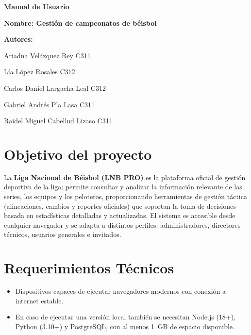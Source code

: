 \documentclass{report}
\begin{document}
    \begin{titlepage}
        \centering
        {\bfseries\Huge Manual de Usuario \par}
        \vspace*{1cm}
        \vspace*{3cm}
        \vspace*{1cm}
        {\LARGE \textbf{Nombre: Gestión de campeonatos de béisbol} }
        \vfill
        {\bfseries\LARGE Autores: \par}
        {\Large Ariadna Vel\'azquez Rey  C311 \par}
        {\Large L\'ia L\'opez Rosales  C312 \par}
        {\Large Carlos Daniel Largacha Leal  C312 \par}
        {\Large Gabriel Andr\'es Pla Lasa  C311 \par}
        {\Large Raidel Miguel Cabellud Lizaso C311 \par}
        \vfill
    \end{titlepage}

    \section*{Objetivo del proyecto}
    La \textbf{Liga Nacional de Béisbol (LNB PRO)} es la plataforma oficial de gestión deportiva de la
    liga: permite consultar y analizar la información relevante de las series, los equipos y los peloteros,
    proporcionando herramientas de gestión táctica (alineaciones, cambios y reportes oficiales) que soportan
    la toma de decisiones basada en estadísticas detalladas y actualizadas. El sistema es accesible desde
    cualquier navegador y se adapta a distintos perfiles: administradores, directores técnicos, usuarios
    generales e invitados.

    \section*{Requerimientos Técnicos}
    \begin{itemize}
        \item Dispositivos capaces de ejecutar navegadores modernos con conexión a internet estable.
        \item En caso de ejecutar una versión local también se necesitan Node.js (18+), Python (3.10+) y
        PostgreSQL,
        con al menos 1~GB de espacio disponible.
    \end{itemize}
\end{document}
